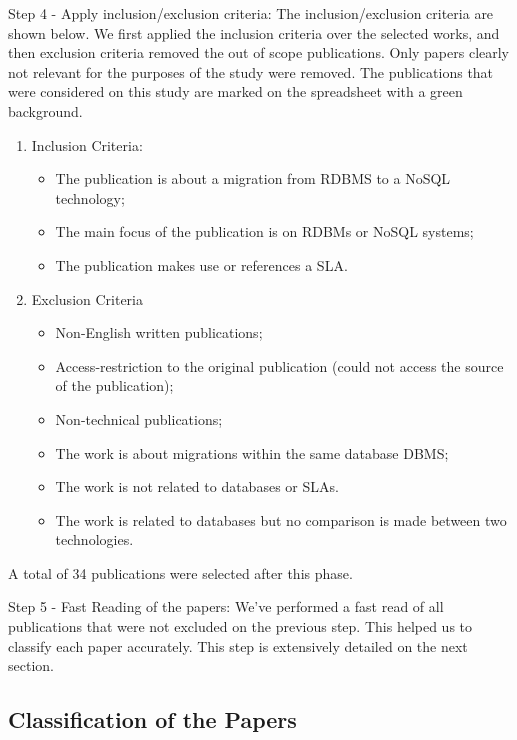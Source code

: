\documentclass[]{tEIS2e}
\theoremstyle{plain}
\theoremstyle{remark}
\begin{document}
Step 4 - Apply inclusion/exclusion criteria: The inclusion/exclusion criteria are shown below. We first applied the inclusion criteria over the selected works, and then exclusion criteria removed the out of scope publications. Only papers clearly not relevant for the purposes of the study were removed. The publications that were considered on this study are marked on the spreadsheet with a green background.

\begin{enumerate}
    \item Inclusion Criteria: 
    \begin{itemize}
      \item The publication is about a migration from RDBMS to a NoSQL technology;
      \item The main focus of the publication is on RDBMs or NoSQL systems;
      \item The publication makes use or references a SLA.
    \end{itemize}
    \item Exclusion Criteria
	\begin{itemize}
    \item Non-English written publications;
		\item Access-restriction to the original publication (could not access the source of the publication);
		\item Non-technical publications;
    \item The work is about migrations within the same database DBMS;
    \item The work is not related to databases or SLAs.
    \item The work is related to databases but no comparison is made between two technologies.
    \end{itemize}
    
\end{enumerate}
A total of 34 publications were selected after this phase. 

Step 5 - Fast Reading of the papers: We've performed a fast read of all publications that were not excluded on the previous step. This helped us to classify each paper accurately. This step is extensively detailed on the next section. 


\subsection{Classification of the Papers}
\end{document}
